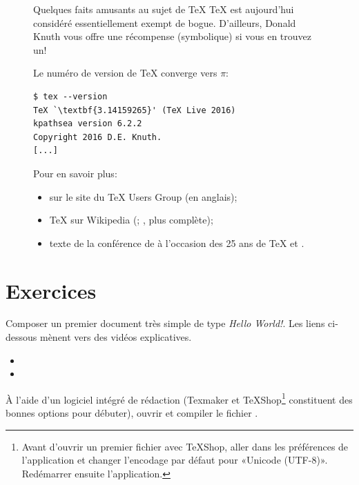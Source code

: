 \begin{figure}[t]
  \begin{emphbox}{\mdseries Quelques faits amusants au sujet de {\TeX}}
    {\TeX} est aujourd'hui considéré essentiellement exempt de bogue.
    D'ailleurs, Donald Knuth vous offre une récompense (symbolique) si
    vous en trouvez un!

    Le numéro de version de {\TeX} converge vers $\pi$:
\begin{lstlisting}
$ tex --version
TeX `\textbf{3.14159265}' (TeX Live 2016)
kpathsea version 6.2.2
Copyright 2016 D.E. Knuth.
[...]
\end{lstlisting} %
    Pour en savoir plus:
    \begin{itemize}
    \item {} sur
      le site du {\TeX} Users Group (en anglais);
    \item {\TeX} sur Wikipedia
      (;
      , plus
      complète);
    \item texte de la conférence de \citet{Beebe:keynote:2004} à
      l'occasion des 25 ans de {\TeX} et .
    \end{itemize}
\end{emphbox}
\end{figure}


\section{Exercices}
\label{sec:presentation:exercices}

\begin{exercice}[nosol]
  Composer un premier document très simple de type \emph{Hello
    World!}. Les liens ci-dessous mènent vers des vidéos explicatives.
  \begin{itemize}
    \normalsize
  \item {}
  \item {}
  \end{itemize}
\end{exercice}

\begin{exercice}[nosol]
  À l'aide d'un logiciel intégré de rédaction (Texmaker et
  TeXShop\footnote{%
    Avant d'ouvrir un premier fichier avec TeXShop, aller dans les
    préférences de l'application et changer l'encodage par défaut pour
    «Unicode (UTF-8)». Redémarrer ensuite l'application.}
  constituent des bonnes options pour débuter), ouvrir et compiler le
  fichier .
\end{exercice}

